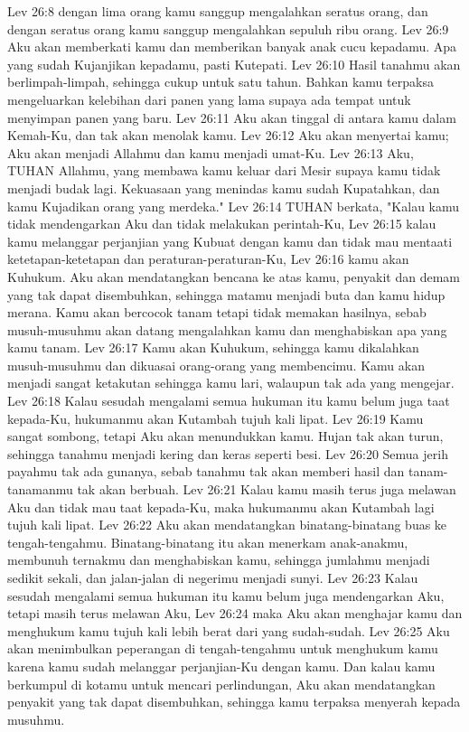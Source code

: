 Lev 26:8  dengan lima orang kamu sanggup mengalahkan seratus orang, dan dengan seratus orang kamu sanggup mengalahkan sepuluh ribu orang.
Lev 26:9  Aku akan memberkati kamu dan memberikan banyak anak cucu kepadamu. Apa yang sudah Kujanjikan kepadamu, pasti Kutepati.
Lev 26:10  Hasil tanahmu akan berlimpah-limpah, sehingga cukup untuk satu tahun. Bahkan kamu terpaksa mengeluarkan kelebihan dari panen yang lama supaya ada tempat untuk menyimpan panen yang baru.
Lev 26:11  Aku akan tinggal di antara kamu dalam Kemah-Ku, dan tak akan menolak kamu.
Lev 26:12  Aku akan menyertai kamu; Aku akan menjadi Allahmu dan kamu menjadi umat-Ku.
Lev 26:13  Aku, TUHAN Allahmu, yang membawa kamu keluar dari Mesir supaya kamu tidak menjadi budak lagi. Kekuasaan yang menindas kamu sudah Kupatahkan, dan kamu Kujadikan orang yang merdeka."
Lev 26:14  TUHAN berkata, "Kalau kamu tidak mendengarkan Aku dan tidak melakukan perintah-Ku,
Lev 26:15  kalau kamu melanggar perjanjian yang Kubuat dengan kamu dan tidak mau mentaati ketetapan-ketetapan dan peraturan-peraturan-Ku,
Lev 26:16  kamu akan Kuhukum. Aku akan mendatangkan bencana ke atas kamu, penyakit dan demam yang tak dapat disembuhkan, sehingga matamu menjadi buta dan kamu hidup merana. Kamu akan bercocok tanam tetapi tidak memakan hasilnya, sebab musuh-musuhmu akan datang mengalahkan kamu dan menghabiskan apa yang kamu tanam.
Lev 26:17  Kamu akan Kuhukum, sehingga kamu dikalahkan musuh-musuhmu dan dikuasai orang-orang yang membencimu. Kamu akan menjadi sangat ketakutan sehingga kamu lari, walaupun tak ada yang mengejar.
Lev 26:18  Kalau sesudah mengalami semua hukuman itu kamu belum juga taat kepada-Ku, hukumanmu akan Kutambah tujuh kali lipat.
Lev 26:19  Kamu sangat sombong, tetapi Aku akan menundukkan kamu. Hujan tak akan turun, sehingga tanahmu menjadi kering dan keras seperti besi.
Lev 26:20  Semua jerih payahmu tak ada gunanya, sebab tanahmu tak akan memberi hasil dan tanam-tanamanmu tak akan berbuah.
Lev 26:21  Kalau kamu masih terus juga melawan Aku dan tidak mau taat kepada-Ku, maka hukumanmu akan Kutambah lagi tujuh kali lipat.
Lev 26:22  Aku akan mendatangkan binatang-binatang buas ke tengah-tengahmu. Binatang-binatang itu akan menerkam anak-anakmu, membunuh ternakmu dan menghabiskan kamu, sehingga jumlahmu menjadi sedikit sekali, dan jalan-jalan di negerimu menjadi sunyi.
Lev 26:23  Kalau sesudah mengalami semua hukuman itu kamu belum juga mendengarkan Aku, tetapi masih terus melawan Aku,
Lev 26:24  maka Aku akan menghajar kamu dan menghukum kamu tujuh kali lebih berat dari yang sudah-sudah.
Lev 26:25  Aku akan menimbulkan peperangan di tengah-tengahmu untuk menghukum kamu karena kamu sudah melanggar perjanjian-Ku dengan kamu. Dan kalau kamu berkumpul di kotamu untuk mencari perlindungan, Aku akan mendatangkan penyakit yang tak dapat disembuhkan, sehingga kamu terpaksa menyerah kepada musuhmu.
